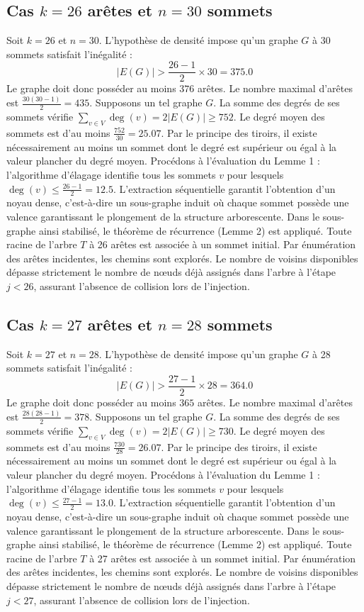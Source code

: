 \documentclass[12pt,a4paper]{article}
\begin{document}
\subsection{Cas $k = 26$ arêtes et $n = 30$ sommets}
Soit $k = 26$ et $n = 30$. L'hypothèse de densité impose qu'un graphe $G$ à 30 sommets satisfait l'inégalité :
$$ |E(G)| > \frac{26-1}{2} \times 30 = 375.0 $$
Le graphe doit donc posséder au moins $376$ arêtes. Le nombre maximal d'arêtes est $\frac{30(30-1)}{2} = 435$.
Supposons un tel graphe $G$. La somme des degrés de ses sommets vérifie $\sum_{v \in V} \deg(v) = 2|E(G)| \geq 752$.
Le degré moyen des sommets est d'au moins $\frac{752}{30} = 25.07$.
Par le principe des tiroirs, il existe nécessairement au moins un sommet dont le degré est supérieur ou égal à la valeur plancher du degré moyen.
Procédons à l'évaluation du Lemme 1 : l'algorithme d'élagage identifie tous les sommets $v$ pour lesquels $\deg(v) \leq \frac{26-1}{2} = 12.5$.
L'extraction séquentielle garantit l'obtention d'un noyau dense, c'est-à-dire un sous-graphe induit où chaque sommet possède une valence garantissant le plongement de la structure arborescente.
Dans le sous-graphe ainsi stabilisé, le théorème de récurrence (Lemme 2) est appliqué. Toute racine de l'arbre $T$ à 26 arêtes est associée à un sommet initial. Par énumération des arêtes incidentes, les chemins sont explorés. Le nombre de voisins disponibles dépasse strictement le nombre de nœuds déjà assignés dans l'arbre à l'étape $j < 26$, assurant l'absence de collision lors de l'injection.

\subsection{Cas $k = 27$ arêtes et $n = 28$ sommets}
Soit $k = 27$ et $n = 28$. L'hypothèse de densité impose qu'un graphe $G$ à 28 sommets satisfait l'inégalité :
$$ |E(G)| > \frac{27-1}{2} \times 28 = 364.0 $$
Le graphe doit donc posséder au moins $365$ arêtes. Le nombre maximal d'arêtes est $\frac{28(28-1)}{2} = 378$.
Supposons un tel graphe $G$. La somme des degrés de ses sommets vérifie $\sum_{v \in V} \deg(v) = 2|E(G)| \geq 730$.
Le degré moyen des sommets est d'au moins $\frac{730}{28} = 26.07$.
Par le principe des tiroirs, il existe nécessairement au moins un sommet dont le degré est supérieur ou égal à la valeur plancher du degré moyen.
Procédons à l'évaluation du Lemme 1 : l'algorithme d'élagage identifie tous les sommets $v$ pour lesquels $\deg(v) \leq \frac{27-1}{2} = 13.0$.
L'extraction séquentielle garantit l'obtention d'un noyau dense, c'est-à-dire un sous-graphe induit où chaque sommet possède une valence garantissant le plongement de la structure arborescente.
Dans le sous-graphe ainsi stabilisé, le théorème de récurrence (Lemme 2) est appliqué. Toute racine de l'arbre $T$ à 27 arêtes est associée à un sommet initial. Par énumération des arêtes incidentes, les chemins sont explorés. Le nombre de voisins disponibles dépasse strictement le nombre de nœuds déjà assignés dans l'arbre à l'étape $j < 27$, assurant l'absence de collision lors de l'injection.
\end{document}
